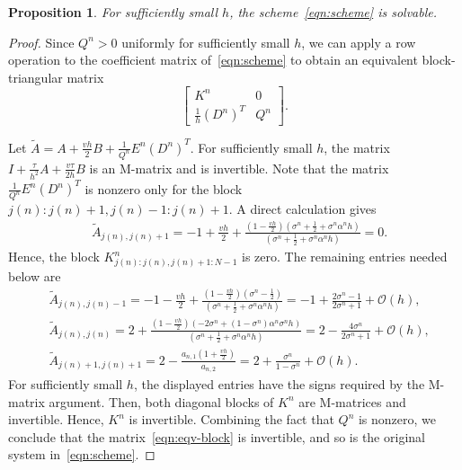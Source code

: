 \documentclass[11pt,reqno]{amsart}
\theoremstyle{plain}
\newtheorem{proposition}[theorem]{Proposition}
\theoremstyle{definition}
\numberwithin{equation}{section}
\newcommand{\paren}[1]{\left(#1\right)}
\newcommand{\mc}[1]{\mathcal{#1}}
\newcommand{\wt}[1]{\widetilde{#1}}
\begin{document}
\begin{proposition}\label{prop:solvability}
For sufficiently small $h$, the scheme~\eqref{eqn:scheme} is solvable.
\end{proposition}
\begin{proof}
Since $Q^n > 0$ uniformly for sufficiently small $h$, we can apply a row operation to the coefficient matrix of~\eqref{eqn:scheme} to obtain an equivalent block-triangular matrix
\begin{equation}\label{eqn:eqv-block}
\begin{bmatrix}
K^n & 0\\
\frac{1}{h}(D^n)^T & Q^n
\end{bmatrix}.
\end{equation}


Let $\wt A = A + \frac{vh}{2} B + \frac{1}{Q^n} E^n (D^{n})^T$.
For sufficiently small $h$, the matrix $I + \frac{\tau
}{h^2}A+\frac{v\tau}{2h}B$ is an M-matrix and is invertible. Note that the matrix $\frac{1}{Q^n}E^n(D^n)^T$ is nonzero only for the block $j(n):j(n)+1, j(n)-1:j(n)+1$.
A direct calculation gives
\begin{equation}
\begin{aligned}
    &\wt{A}_{j(n), j(n)+1}  = -1 + \frac{vh}{2} + \frac{\paren{1-\frac{vh}{2}} \paren{\sigma^n+\frac{1}{2}+\sigma^n\alpha^nh} }{\paren{\sigma^n+\frac{1}{2}+\sigma^n\alpha^nh} } = 0.
\end{aligned}
\end{equation}
Hence, the block $K^n_{j(n):j(n), j(n)+1:N-1}$ is zero.
The remaining entries needed below are
\begin{equation}
\begin{aligned}
    &\wt{A}_{j(n), j(n)-1}  = -1 - \frac{vh}{2} + \frac{\paren{1-\frac{vh}{2}} \paren{\sigma^n-\frac{1}{2}} }{\paren{\sigma^n+\frac{1}{2}+\sigma^n\alpha^nh} } = -1 + \frac{2\sigma^n-1}{2\sigma^n+1} + \mc O(h), \\
    &\wt{A}_{j(n), j(n)} = 2 + \frac{\paren{1-\frac{vh}{2}} \paren{-2\sigma^n+\paren{1-\sigma^n}\alpha^n\sigma^nh} }{\paren{\sigma^n+\frac{1}{2}+\sigma^n\alpha^nh} } = 2 - \frac{4\sigma^n}{2\sigma^n+1} + \mc O(h),  \\
    &\wt{A}_{j(n)+1, j(n)+1} = 2 - \frac{a_{n,1}\paren{1+\frac{vh}{2}} }{a_{n,2} } = 2 + \frac{\sigma^n}{1-\sigma^n} + \mc O(h).
\end{aligned}
\end{equation}
For sufficiently small $h$, the displayed entries have the signs required by the M-matrix argument. Then, both diagonal blocks of $K^n$ are M-matrices and invertible. Hence, $K^n$ is invertible. Combining the fact that $Q^n$ is nonzero, we conclude that the matrix~\eqref{eqn:eqv-block} is invertible, and so is the original system in~\eqref{eqn:scheme}.
\end{proof}
\end{document}
